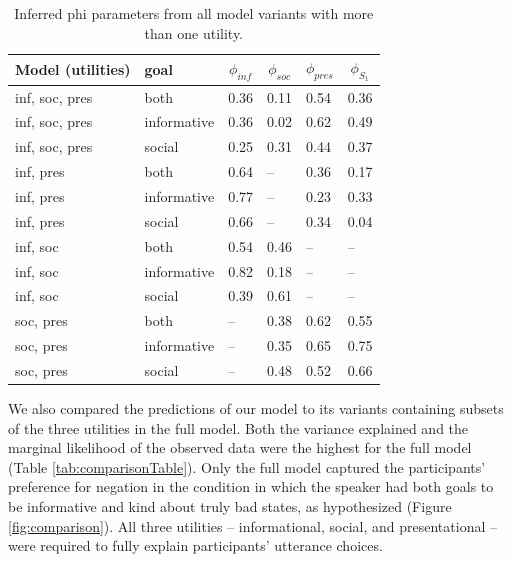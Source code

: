 \documentclass[9pt,twocolumn,twoside,lineno]{main_class_file}
\begin{document}
\begin{table}[tbp]
\begin{center}
\begin{threeparttable}
\caption{\label{tab:phi}Inferred phi parameters from all model variants with more than one utility.}
\begin{tabularx}{\columnwidth}{llllll}
\toprule
Model (utilities) & \multicolumn{1}{l}{goal} & \multicolumn{1}{c}{$\phi_{inf}$} & \multicolumn{1}{c}{$\phi_{soc}$} & \multicolumn{1}{c}{$\phi_{pres}$} & \multicolumn{1}{c}{$\phi_{S_1}$}\\
\midrule
inf, soc, pres & both & 0.36 & 0.11 & 0.54 & 0.36\\
inf, soc, pres & informative & 0.36 & 0.02 & 0.62 & 0.49\\
inf, soc, pres & social & 0.25 & 0.31 & 0.44 & 0.37\\
inf, pres & both & 0.64 & -- & 0.36 & 0.17\\
inf, pres & informative & 0.77 & -- & 0.23 & 0.33\\
inf, pres & social & 0.66 & -- & 0.34 & 0.04\\
inf, soc & both & 0.54 & 0.46 & -- & --\\
inf, soc & informative & 0.82 & 0.18 & -- & --\\
inf, soc & social & 0.39 & 0.61 & -- & --\\
soc, pres & both & -- & 0.38 & 0.62 & 0.55\\
soc, pres & informative & -- & 0.35 & 0.65 & 0.75\\
soc, pres & social & -- & 0.48 & 0.52 & 0.66\\
\bottomrule
\end{tabularx}
\end{threeparttable}
\end{center}
\end{table}

We also compared the predictions of our model to its variants containing
subsets of the three utilities in the full model. Both the variance
explained and the marginal likelihood of the observed data were the
highest for the full model (Table \ref{tab:comparisonTable}). Only the
full model captured the participants' preference for negation in the
condition in which the speaker had both goals to be informative and kind
about truly bad states, as hypothesized (Figure \ref{fig:comparison}).
All three utilities -- informational, social, and presentational -- were
required to fully explain participants' utterance choices.
\end{document}
